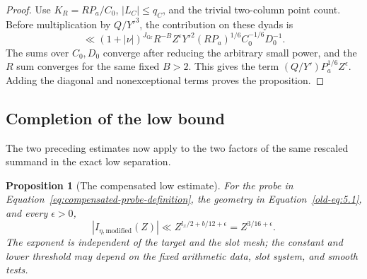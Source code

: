 \documentclass[11pt,a4paper]{article}
\numberwithin{equation}{section}
\numberwithin{figure}{section}
\newtheorem{proposition}[theorem]{Proposition}
\theoremstyle{definition}
\theoremstyle{remark}
\begin{document}
\begin{proof}
Use $K_R=RP_a/C_0$, $|L_C|\le q_C$, and the trivial two-column
point count.  Before multiplication by $Q/Y'^3$, the contribution
on these dyads is
\[
 \ll (1+|\nu|)^{J_{\mathrm{Gr}}} R^{-B}Z^\epsilon
       Y'^2(RP_a)^{1/6}C_0^{-1/6}D_0^{-1}.
\]
The sums over $C_0,D_0$ converge after reducing the arbitrary small
power, and the $R$ sum converges for the same fixed $B>2$.  This
gives the term $(Q/Y')P_a^{1/6}Z^\epsilon$.  Adding the diagonal
and nonexceptional terms proves the proposition.
\end{proof}

\subsection{Completion of the low bound}

The two preceding estimates now apply to the two factors of the same
rescaled summand in the exact low separation.

\begin{proposition}[The compensated low estimate]\label{prop:probe-low}
For the probe in Equation~\eqref{eq:compensated-probe-definition},
the geometry in Equation~\eqref{old-eq:5.1}, and every
$\epsilon>0$,
\begin{equation}
 |I_{\eta,\mathrm{modified}}(Z)|
       \ll Z^{l_x/2+b/12+\epsilon}=Z^{3/16+\epsilon}.
 \label{old-eq:5.10}
\end{equation}
The exponent is independent of the target and the slot mesh; the
constant and lower threshold may depend on the fixed arithmetic
data, slot system, and smooth tests.
\end{proposition}
\end{document}

